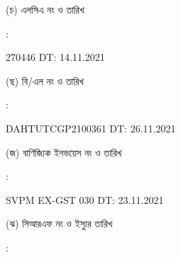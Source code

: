 \documentclass[12pt]{article}
\newcommand{\blno}{DAHTUTCGP2100361}
\newcommand{\bldt}{26.11.2021}
\newcommand{\lcdt}{14.11.2021}
\newcommand{\lcano}{270446}
\newcommand{\lcadt}{\lcdt}
\newcommand{\invno}{SVPM EX-GST 030}
\newcommand{\invdt}{23.11.2021}
\begin{document}
\begin{minipage}[t]{0.05\linewidth}
\hspace*{1em}
\end{minipage}
\begin{minipage}[t]{0.40\linewidth}
(চ) এলসিএ নং ও তারিখ
\end{minipage}
\begin{minipage}[t]{0.02\linewidth}
:
\end{minipage}
\begin{minipage}[t]{0.53\linewidth}
{\lcano} \hspace{2em} DT: {\lcadt}
\\
\end{minipage}
\begin{minipage}[t]{0.05\linewidth}
\hspace*{1em}
\end{minipage}
\begin{minipage}[t]{0.40\linewidth}
(ছ) বি/এল নং ও তারিখ
\end{minipage}
\begin{minipage}[t]{0.02\linewidth}
:
\end{minipage}
\begin{minipage}[t]{0.53\linewidth}
{\blno} \hspace{2em} DT: {\bldt}
\\
\end{minipage}
\begin{minipage}[t]{0.05\linewidth}
\hspace*{1em}
\end{minipage}
\begin{minipage}[t]{0.40\linewidth}
(জ) বাণিজ্যিক ইনভয়েস নং ও তারিখ
\end{minipage}
\begin{minipage}[t]{0.02\linewidth}
:
\end{minipage}
\begin{minipage}[t]{0.53\linewidth}
{\invno} \hspace{2em} DT: {\invdt}
\\
\end{minipage}
\begin{minipage}[t]{0.05\linewidth}
\hspace*{1em}
\end{minipage}
\begin{minipage}[t]{0.40\linewidth}
(ঝ) সিআরএফ নং ও ইস্যুর তারিখ
\end{minipage}
\begin{minipage}[t]{0.02\linewidth}
:
\end{minipage}
\end{document}
